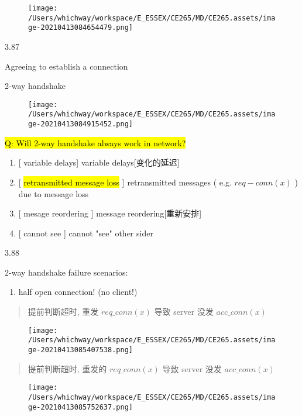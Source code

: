 \documentclass[
]{article}
\begin{document}
\begin{figure}
\centering
\texttt{[image: /Users/whichway/workspace/E\_ESSEX/CE265/MD/CE265.assets/image-20210413084654479.png]}
\caption{}
\end{figure}

3.87

Agreeing to establish a connection

2-way handshake

\begin{figure}
\centering
\texttt{[image: /Users/whichway/workspace/E\_ESSEX/CE265/MD/CE265.assets/image-20210413084915452.png]}
\caption{}
\end{figure}

\hl{Q: Will 2-way handshake always work in network?}

\begin{enumerate}
\def\labelenumi{\arabic{enumi}.}
\item
  {[} variable delays{]} variable delays{[}变化的延迟{]}
\item
  {[} \hl{retransmitted message loss} {]} retransmitted messages ( e.g.
  \(req-conn(x) \) ) due to message loss
\item
  {[} mesage reordering {]} message reordering{[}重新安排{]}
\item
  {[} cannot see {]} cannot "see" other sider
\end{enumerate}

3.88

2-way handshake failure scenarios:

\begin{enumerate}
\def\labelenumi{\arabic{enumi}.}
\item
  half open connection! (no client!)
\end{enumerate}

\begin{quote}
提前判断超时, 重发 \(req\_conn(x)\) 导致 server 没发 \(acc\_conn(x)\)
\end{quote}

\begin{figure}
\centering
\texttt{[image: /Users/whichway/workspace/E\_ESSEX/CE265/MD/CE265.assets/image-20210413085407538.png]}
\caption{}
\end{figure}

\begin{quote}
提前判断超时, 重发的 \(req\_conn(x)\) 导致 server 没发 \(acc\_conn(x)\)
\end{quote}

\begin{figure}
\centering
\texttt{[image: /Users/whichway/workspace/E\_ESSEX/CE265/MD/CE265.assets/image-20210413085752637.png]}
\caption{}
\end{figure}
\end{document}
